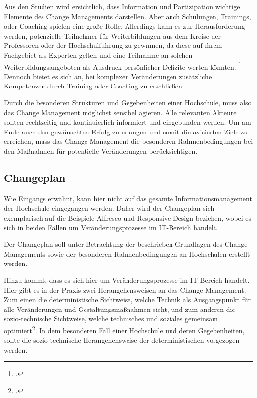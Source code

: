 Aus den Studien wird ersichtlich, dass Information und Partizipation wichtige Elemente des Change Managements darstellen. Aber auch Schulungen, Trainings, oder Coaching spielen eine große Rolle. Allerdings kann es zur Herausforderung werden, potenzielle Teilnehmer für Weiterbildungen aus dem Kreise der Professoren oder der Hochschulführung zu gewinnen, da diese auf ihrem Fachgebiet als Experten gelten und eine Teilnahme an solchen Weiterbildungsangeboten als Ausdruck persönlicher Defizite werten könnten. \footcite[Vgl. Pellert, Schönwald zitiert nach][]{sonntag_change_2008} Dennoch bietet es sich an, bei komplexen Veränderungen zusätzliche Kompetenzen durch Training oder Coaching zu erschließen.

Durch die besonderen Strukturen und Gegebenheiten einer Hochschule, muss  also das Change Management möglichst sensibel agieren. Alle relevanten Akteure sollten rechtzeitig und kontinuierlich informiert und eingebunden werden. Um am Ende auch den gewünschten Erfolg zu erlangen und somit die avisierten Ziele zu erreichen, muss das Change Management die besonderen Rahmenbedingungen bei den Maßnahmen für potentielle Veränderungen berücksichtigen. 

\subsection{Changeplan}
\label{subsection_changeplan}
Wie Eingangs erwähnt, kann hier nicht auf das gesamte Informationsmanagement der Hochschule eingegangen werden. Daher wird der Changeplan sich exemplarisch auf die Beispiele Alfresco und Responsive Design beziehen, wobei es sich in beiden Fällen um Veränderungsprozesse im IT-Bereich handelt.

Der Changeplan soll unter Betrachtung der beschrieben Grundlagen des Change Managements sowie der besonderen Rahmenbedingungen an Hochschulen erstellt werden.

Hinzu kommt, dass es sich hier um Veränderungsprozesse im IT-Bereich handelt. 
Hier gibt es in der Praxis zwei Herangehensweisen an das Change Management. 
Zum einen die deterministische Sichtweise, welche Technik als Ausgangspunkt für alle Veränderungen und Gestaltungsmaßnahmen sieht, und zum anderen die sozio-technische Sichtweise, welche technisches und soziales gemeinsam optimiert\footcite[Vgl.][]{feldmuller_change_2007}. In dem besonderen Fall einer Hochschule und deren Gegebenheiten, sollte die sozio-technische Herangehensweise der deterministischen vorgezogen werden.  

